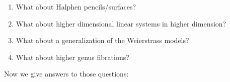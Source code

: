 \begin{enumerate}
\item What about Halphen pencils/surfaces?

\item \leavevmode
[Recall the construction above on $X$ =
Grasmannian of lines
in
$H^0(\mathbb{P}^2,\mathcal{O}_{\mathbb{P}^2}
(3))$:
why
only in $\mathbb{P}^2$? Why only degree $3$?]
What about higher dimensional linear systems
in higher dimension?

\item What about a generalization of the
Weierstrass models?

\item [(1')] What  about higher genus
fibrations?
\end{enumerate}

\noindent
Now we give answers to those questions:

